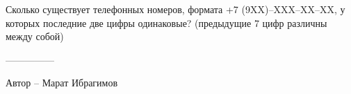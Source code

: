 \question
Сколько существует телефонных номеров, формата +7 (9XX)–XXX–XX–XX, у которых последние две цифры одинаковые? (предыдущие 7 цифр различны между собой)

---------------

Автор -- Марат Ибрагимов
